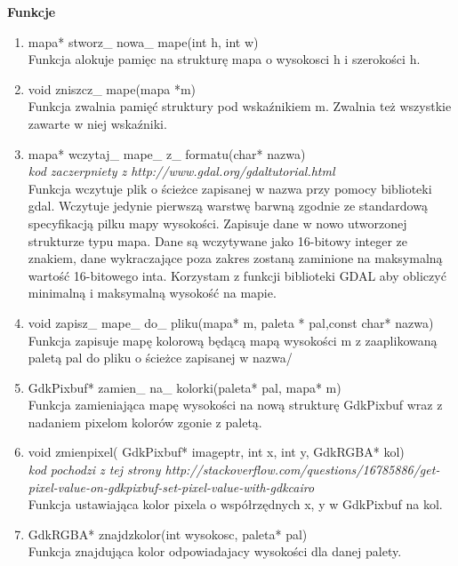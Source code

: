 \documentclass[a4paper]{article}
\begin{document}
  \textbf{Funkcje}
  \begin{enumerate}
  
  \item{mapa* stworz\_ nowa\_ mape(int h, int w)}\\
  Funkcja alokuje pamięc na strukturę mapa o wysokosci h i szerokości h.
  
  \item{void zniszcz\_ mape(mapa *m)}\\
  Funkcja zwalnia pamięć struktury pod wskaźnikiem m. Zwalnia też wszystkie zawarte w niej wskaźniki.
  
  \item{mapa* wczytaj\_ mape\_ z\_ formatu(char* nazwa)}\\
  \textit{kod zaczerpniety z http://www.gdal.org/gdal\textunderscore tutorial.html}\\
  Funkcja wczytuje plik o ścieżce zapisanej w nazwa przy pomocy biblioteki gdal. Wczytuje jedynie pierwszą warstwę barwną zgodnie ze standardową specyfikacją pilku mapy wysokości. Zapisuje dane w nowo utworzonej strukturze typu mapa. Dane są wczytywane jako 16-bitowy integer ze znakiem, dane wykraczające poza zakres zostaną zaminione na maksymalną wartość 16-bitowego inta. Korzystam z funkcji biblioteki GDAL aby obliczyć minimalną i maksymalną wysokość na mapie. 
  
  \item{void zapisz\_ mape\_ do\_ pliku(mapa* m, paleta * pal,const char* nazwa)}\\
  Funkcja zapisuje mapę kolorową będącą mapą wysokości m z zaaplikowaną paletą pal do pliku o ścieżce zapisanej w nazwa/
  
   \item{GdkPixbuf* zamien\_ na\_ kolorki(paleta* pal, mapa* m)}\\
   Funkcja zamieniająca mapę wysokości na nową strukturę GdkPixbuf wraz z nadaniem pixelom kolorów zgonie z paletą. 
   
   \item{void zmien\textunderscore pixel( GdkPixbuf* imageptr, int x, int y, GdkRGBA* kol)}\\
   \textit{ kod pochodzi z tej strony http://stackoverflow.com/questions/16785886/get-pixel-value-on-gdkpixbuf-set-pixel-value-with-gdkcairo}\\
	Funkcja ustawiająca kolor pixela o współrzędnych x, y w GdkPixbuf na kol.
	
	\item{GdkRGBA* znajdz\textunderscore kolor(int wysokosc, paleta* pal)}\\
	Funkcja znajdująca kolor odpowiadajacy wysokości dla danej palety.
	

\end{enumerate}
\end{document}
